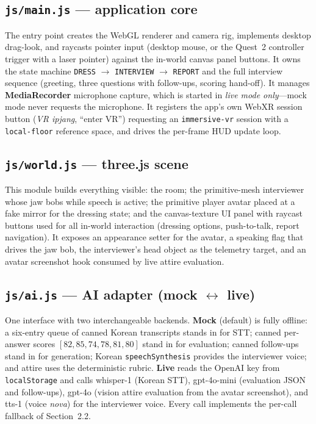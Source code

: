 \documentclass[10pt,a4paper]{article}
\begin{document}
\subsection{\texttt{js/main.js} --- application core}
The entry point creates the WebGL renderer and camera rig, implements desktop drag-look, and raycasts pointer input (desktop mouse, or the Quest~2 controller trigger with a laser pointer) against the in-world canvas panel buttons. It owns the state machine \texttt{DRESS} $\rightarrow$ \texttt{INTERVIEW} $\rightarrow$ \texttt{REPORT} and the full interview sequence (greeting, three questions with follow-ups, scoring hand-off). It manages \textbf{MediaRecorder} microphone capture, which is started in \emph{live mode only}---mock mode never requests the microphone. It registers the app's own WebXR session button (\emph{VR ipjang}, ``enter VR'') requesting an \texttt{immersive-vr} session with a \texttt{local-floor} reference space, and drives the per-frame HUD update loop.

\subsection{\texttt{js/world.js} --- three.js scene}
This module builds everything visible: the room; the primitive-mesh interviewer whose jaw bobs while speech is active; the primitive player avatar placed at a fake mirror for the dressing state; and the canvas-texture UI panel with raycast buttons used for all in-world interaction (dressing options, push-to-talk, report navigation). It exposes an appearance setter for the avatar, a speaking flag that drives the jaw bob, the interviewer's head object as the telemetry target, and an avatar screenshot hook consumed by live attire evaluation.

\subsection{\texttt{js/ai.js} --- AI adapter (mock $\leftrightarrow$ live)}
One interface with two interchangeable backends. \textbf{Mock} (default) is fully offline: a six-entry queue of canned Korean transcripts stands in for STT; canned per-answer scores $[82, 85, 74, 78, 81, 80]$ stand in for evaluation; canned follow-ups stand in for generation; Korean \texttt{speechSynthesis} provides the interviewer voice; and attire uses the deterministic rubric. \textbf{Live} reads the OpenAI key from \texttt{localStorage} and calls whisper-1 (Korean STT), gpt-4o-mini (evaluation JSON and follow-ups), gpt-4o (vision attire evaluation from the avatar screenshot), and tts-1 (voice \emph{nova}) for the interviewer voice. Every call implements the per-call fallback of Section~2.2.
\end{document}
